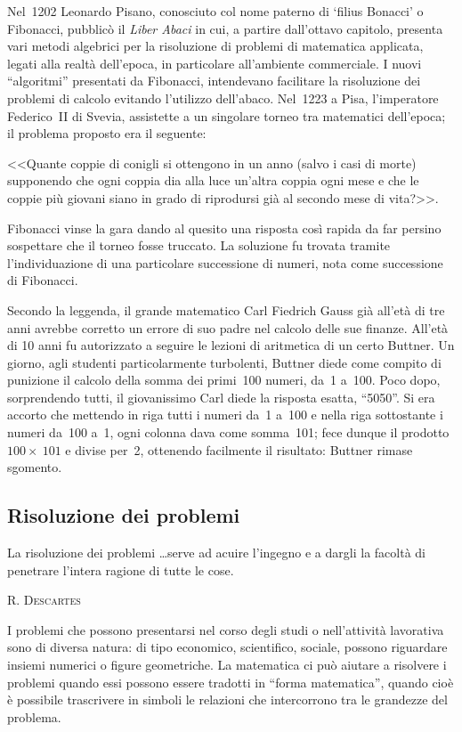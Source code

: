 Nel~1202 Leonardo Pisano, conosciuto col nome paterno di
`filius Bonacci' o Fibonacci, pubblicò il
\emph{Liber Abaci} in cui, a partire dall'ottavo
capitolo, presenta vari metodi algebrici per la risoluzione di problemi
di matematica applicata, legati alla realtà
dell'epoca, in particolare
all'ambiente commerciale. I nuovi
``algoritmi'' presentati da Fibonacci,
intendevano facilitare la risoluzione dei problemi di calcolo evitando
l'utilizzo dell'abaco. Nel~1223 a
Pisa, l'imperatore Federico~II di Svevia, assistette a
un singolare torneo tra matematici dell'epoca; il
problema proposto era il seguente:

<<Quante coppie di conigli si ottengono in un anno (salvo i
casi di morte) supponendo che ogni coppia dia alla luce
un'altra coppia ogni mese e che le coppie più
giovani siano in grado di riprodursi già al secondo mese di
vita?>>.

Fibonacci vinse la gara dando al quesito una risposta così rapida da
far persino sospettare che il torneo fosse truccato. La soluzione fu
trovata tramite l'individuazione di una particolare
successione di numeri, nota come successione di Fibonacci.

Secondo la leggenda, il grande matematico Carl Fiedrich Gauss già
all'età di tre anni avrebbe corretto un errore di
suo padre nel calcolo delle sue finanze. All'età di
10 anni fu autorizzato a seguire le lezioni di aritmetica di un certo
Buttner. Un giorno, agli studenti particolarmente turbolenti, Buttner
diede come compito di punizione il calcolo della somma dei primi~100
numeri, da~1 a~100. Poco dopo, sorprendendo tutti, il giovanissimo Carl
diede la risposta esatta, ``5050''.
Si era accorto che mettendo in riga tutti i numeri da~1 a~100 e nella
riga sottostante i numeri da~100 a~1, ogni colonna dava come somma~101;
fece dunque il prodotto~$100\times~101$ e divise per~2, ottenendo facilmente il
risultato: Buttner rimase sgomento.

\subsection{Risoluzione dei problemi}

 \epigraph{La risoluzione dei problemi \ldots serve ad acuire
 l'ingegno e a dargli la facoltà di penetrare
 l'intera ragione di tutte le cose.}{{\scshape{R. Descartes}}}


I problemi che possono presentarsi nel corso degli studi o
nell'attività lavorativa sono di diversa natura: di
tipo economico, scientifico, sociale, possono riguardare insiemi
numerici o figure geometriche. La matematica ci può aiutare a
risolvere i problemi quando essi possono essere tradotti in
``forma matematica'', quando cioè
è possibile trascrivere in simboli le relazioni che intercorrono
tra le grandezze del problema.

